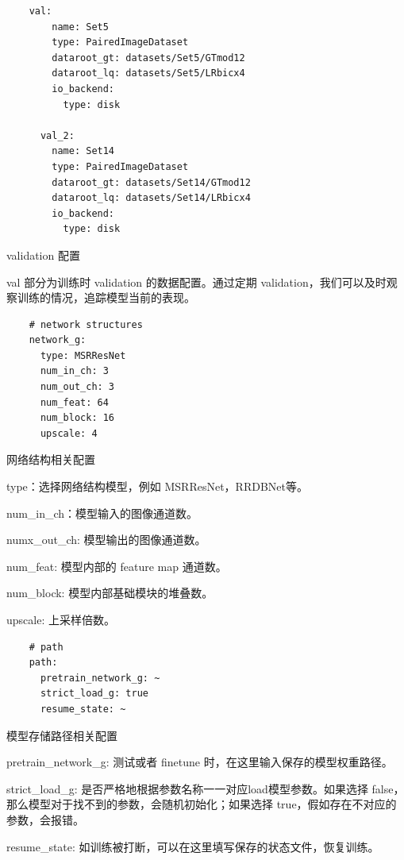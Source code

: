 \documentclass[../main.tex]{subfiles}
\begin{document}
    \begin{verbatim}
    val:
        name: Set5
        type: PairedImageDataset
        dataroot_gt: datasets/Set5/GTmod12
        dataroot_lq: datasets/Set5/LRbicx4
        io_backend:
          type: disk

      val_2:
        name: Set14
        type: PairedImageDataset
        dataroot_gt: datasets/Set14/GTmod12
        dataroot_lq: datasets/Set14/LRbicx4
        io_backend:
          type: disk
    \end{verbatim}
    \begin{exampleBox}[righthand ratio=0.00, sidebyside, sidebyside align=center, lower separated=false]{validation 配置}

    val 部分为训练时 validation 的数据配置。通过定期 validation，我们可以及时观察训练的情况，追踪模型当前的表现。
    \end{exampleBox}
    \begin{verbatim}
    # network structures
    network_g:
      type: MSRResNet
      num_in_ch: 3
      num_out_ch: 3
      num_feat: 64
      num_block: 16
      upscale: 4
    \end{verbatim}
    \begin{exampleBox}[righthand ratio=0.00, sidebyside, sidebyside align=center, lower separated=false]{网络结构相关配置}

    type：选择网络结构模型，例如 MSRResNet，RRDBNet等。

    num\_in\_ch：模型输入的图像通道数。

    numx\_out\_ch: 模型输出的图像通道数。

    num\_feat: 模型内部的 feature map 通道数。

    num\_block: 模型内部基础模块的堆叠数。

    upscale: 上采样倍数。
    \end{exampleBox}
    \begin{verbatim}
    # path
    path:
      pretrain_network_g: ~
      strict_load_g: true
      resume_state: ~
    \end{verbatim}
    \begin{exampleBox}[righthand ratio=0.00, sidebyside, sidebyside align=center, lower separated=false]{模型存储路径相关配置}

    pretrain\_network\_g: 测试或者 finetune 时，在这里输入保存的模型权重路径。

    strict\_load\_g: 是否严格地根据参数名称一一对应load模型参数。如果选择 false，那么模型对于找不到的参数，会随机初始化；如果选择 true，假如存在不对应的参数，会报错。

    resume\_state: 如训练被打断，可以在这里填写保存的状态文件，恢复训练。
    \end{exampleBox}
\end{document}
